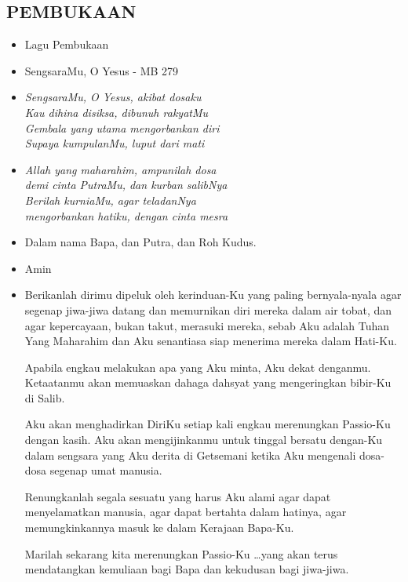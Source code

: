 \documentclass[a5paper,headsepline,titlepage,11pt,nnormalheadings,DIVcalc]{scrbook}
\newcommand{\BU}[1]{\begin{itemize} \item[U:] #1 \end{itemize}}
\newcommand{\BP}[1]{\begin{itemize} \item[P:] #1 \end{itemize}}
\begin{document}
\subsection*{PEMBUKAAN}
\begin{itemize}
\item[~] Lagu Pembukaan
\item[~] SengsaraMu, O Yesus - MB 279
\item[1.] \it{
SengsaraMu, O Yesus, akibat dosaku\\
Kau dihina disiksa, dibunuh rakyatMu\\
Gembala yang utama mengorbankan diri\\
Supaya kumpulanMu, luput dari mati 
}
\item[3.] \it{
Allah yang maharahim, ampunilah dosa\\
demi cinta PutraMu, dan kurban salibNya\\
Berilah kurniaMu, agar teladanNya\\
mengorbankan hatiku, dengan cinta mesra
}
\end{itemize}

\BP{Dalam nama Bapa, dan Putra, dan Roh Kudus. }
\BU{Amin}
 
\BP{Berikanlah dirimu dipeluk oleh kerinduan-Ku yang paling bernyala-nyala agar segenap jiwa-jiwa datang dan memurnikan diri mereka dalam air tobat, dan agar kepercayaan, bukan takut, merasuki mereka, sebab Aku adalah Tuhan Yang Maharahim dan Aku senantiasa siap menerima mereka dalam Hati-Ku.

Apabila engkau melakukan apa yang Aku minta, Aku dekat denganmu. Ketaatanmu akan memuaskan dahaga dahsyat yang mengeringkan bibir-Ku di Salib.

Aku akan menghadirkan DiriKu setiap kali engkau merenungkan Passio-Ku dengan kasih. Aku akan mengijinkanmu untuk tinggal bersatu dengan-Ku dalam sengsara yang Aku derita di Getsemani ketika Aku mengenali dosa-dosa segenap umat manusia.

Renungkanlah segala sesuatu yang harus Aku alami agar dapat menyelamatkan manusia, agar dapat bertahta dalam hatinya, agar memungkinkannya masuk ke dalam Kerajaan Bapa-Ku.

Marilah sekarang kita merenungkan Passio-Ku \dots yang akan terus mendatangkan kemuliaan bagi Bapa dan kekudusan bagi jiwa-jiwa.}
\end{document}
